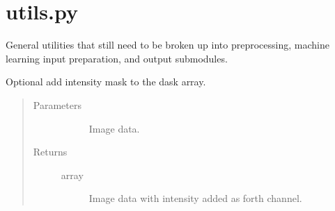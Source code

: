 \documentclass[letterpaper,10pt,english]{sphinxmanual}
\begin{document}
\label{\detokenize{index:module-pathflowai.utils}}

\chapter{utils.py}
\label{\detokenize{index:utils-py}}
General utilities that still need to be broken up into preprocessing, machine learning input preparation, and output submodules.

\begin{fulllineitems}
\label{\detokenize{index:pathflowai.utils.add_purple_mask}}
Optional add intensity mask to the dask array.
\begin{quote}\begin{description}
\item[{Parameters}] \leavevmode\begin{description}
\item[{}] \leavevmode
Image data.

\end{description}

\item[{Returns}] \leavevmode\begin{description}
\item[{array}] \leavevmode
Image data with intensity added as forth channel.

\end{description}

\end{description}\end{quote}

\end{fulllineitems}

\end{document}
